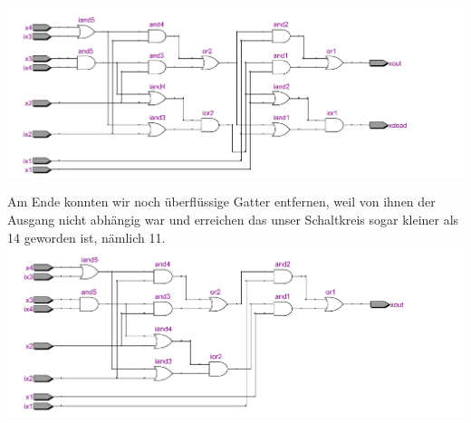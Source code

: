 \documentclass[a4paper]{article}
\begin{document}

\includegraphics[scale=0.50]{images/zwisk.pdf}

Am Ende konnten wir noch \"uberfl\"ussige Gatter entfernen, weil von ihnen der Ausgang nicht abh\"angig war und erreichen das unser Schaltkreis sogar kleiner
als 14 geworden ist, n\"amlich 11.\\



\includegraphics[scale=0.50]{images/endsk.pdf}

\end{document}
